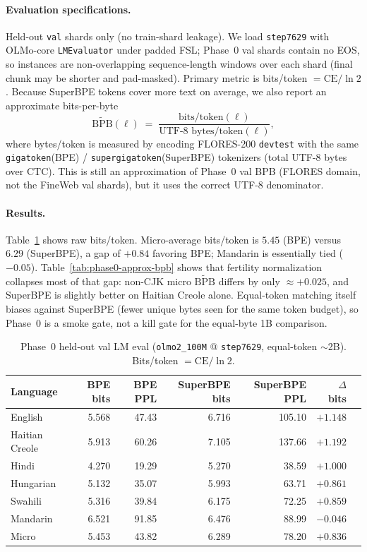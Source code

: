 \documentclass[11pt,a4paper]{article}
\newcommand{\CTC}{\mathrm{CTC}}
\begin{document}
\paragraph{Evaluation specifications.}
Held-out \texttt{val} shards only (no train-shard leakage).
We load \texttt{step7629} with OLMo-core \texttt{LMEvaluator} under padded FSL; Phase~0 val shards contain no EOS, so instances are non-overlapping sequence-length windows over each shard (final chunk may be shorter and pad-masked).
Primary metric is bits/token $=\mathrm{CE}/\ln 2$.
Because SuperBPE tokens cover more text on average, we also report an approximate bits-per-byte
\begin{equation}
  \widetilde{\mathrm{BPB}}(\ell)
  \;=\;
  \frac{\text{bits/token}(\ell)}{\text{UTF-8 bytes/token}(\ell)},
\end{equation}
where bytes/token is measured by encoding FLORES-200 \texttt{devtest} with the same \texttt{gigatoken}(BPE) / \texttt{supergigatoken}(SuperBPE) tokenizers (total UTF-8 bytes over $\CTC$).
This is still an approximation of Phase~0 val BPB (FLORES domain, not the FineWeb val shards), but it uses the correct UTF-8 denominator.

\paragraph{Results.}
Table~\ref{tab:phase0-bits} shows raw bits/token.
Micro-average bits/token is $5.45$ (BPE) versus $6.29$ (SuperBPE), a gap of $+0.84$ favoring BPE; Mandarin is essentially tied ($-0.05$).
Table~\ref{tab:phase0-approx-bpb} shows that fertility normalization collapses most of that gap: non-CJK micro $\widetilde{\mathrm{BPB}}$ differs by only $\approx{+}0.025$, and SuperBPE is slightly better on Haitian Creole alone.
Equal-token matching itself biases against SuperBPE (fewer unique bytes seen for the same token budget), so Phase~0 is a smoke gate, not a kill gate for the equal-byte 1B comparison.

\begin{table}[t]
\centering
\caption{Phase~0 held-out val LM eval (\texttt{olmo2\_100M} @ \texttt{step7629}, equal-token $\sim$2B). Bits/token $=\mathrm{CE}/\ln 2$.}
\label{tab:phase0-bits}
\small
\begin{tabular}{@{}lrrrrrr@{}}
\toprule
Language & BPE bits & BPE PPL & SuperBPE bits & SuperBPE PPL & $\Delta$ bits \\
\midrule
English        & 5.568 & 47.43 & 6.716 & 105.10 & $+1.148$ \\
Haitian Creole & 5.913 & 60.26 & 7.105 & 137.66 & $+1.192$ \\
Hindi          & 4.270 & 19.29 & 5.270 &  38.59 & $+1.000$ \\
Hungarian      & 5.132 & 35.07 & 5.993 &  63.71 & $+0.861$ \\
Swahili        & 5.316 & 39.84 & 6.175 &  72.25 & $+0.859$ \\
Mandarin       & 6.521 & 91.85 & 6.476 &  88.99 & $-0.046$ \\
\midrule
Micro          & 5.453 & 43.82 & 6.289 &  78.20 & $+0.836$ \\
\bottomrule
\end{tabular}
\end{table}
\end{document}
